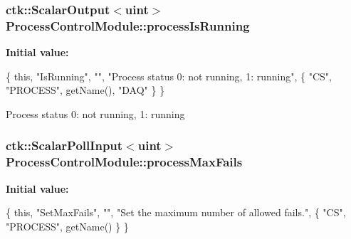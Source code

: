\subsubsection[{\texorpdfstring{process\+Is\+Running}{processIsRunning}}]{\setlength{\rightskip}{0pt plus 5cm}ctk\+::\+Scalar\+Output$<$uint$>$ Process\+Control\+Module\+::process\+Is\+Running}\hypertarget{structProcessControlModule_a63ba3083112290dc80113c7d0c29f6f9}{}\label{structProcessControlModule_a63ba3083112290dc80113c7d0c29f6f9}
{\bfseries Initial value\+:}
\begin{DoxyCode}
\{ \textcolor{keyword}{this}, \textcolor{stringliteral}{"IsRunning"}, \textcolor{stringliteral}{""}, \textcolor{stringliteral}{"Process status 0: not running, 1: running"},
      \{ \textcolor{stringliteral}{"CS"}, \textcolor{stringliteral}{"PROCESS"}, getName(), \textcolor{stringliteral}{"DAQ"} \} \}
\end{DoxyCode}
Process status 0\+: not running, 1\+: running 
\subsubsection[{\texorpdfstring{process\+Max\+Fails}{processMaxFails}}]{\setlength{\rightskip}{0pt plus 5cm}ctk\+::\+Scalar\+Poll\+Input$<$uint$>$ Process\+Control\+Module\+::process\+Max\+Fails}\hypertarget{structProcessControlModule_ad43eac1310031b1680275eaee2630378}{}\label{structProcessControlModule_ad43eac1310031b1680275eaee2630378}
{\bfseries Initial value\+:}
\begin{DoxyCode}
\{ \textcolor{keyword}{this}, \textcolor{stringliteral}{"SetMaxFails"}, \textcolor{stringliteral}{""},
    \textcolor{stringliteral}{"Set the maximum number of allowed fails."},
    \{ \textcolor{stringliteral}{"CS"}, \textcolor{stringliteral}{"PROCESS"}, getName() \} \}
\end{DoxyCode}
